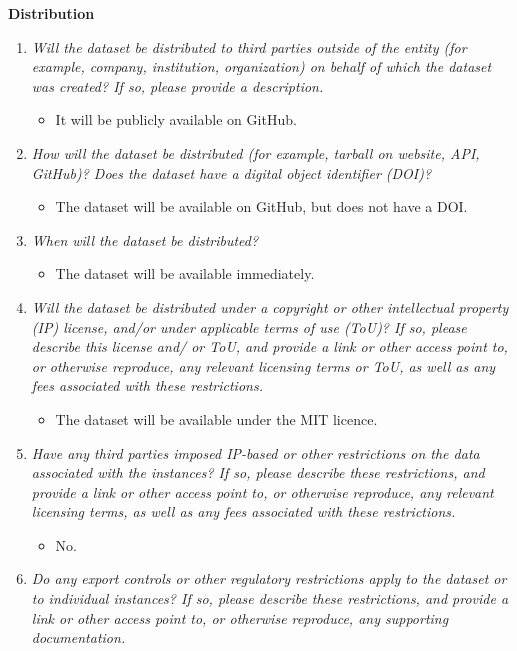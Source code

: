 \documentclass[
]{article}
\providecommand{\tightlist}{%
  \setlength{\itemsep}{0pt}\setlength{\parskip}{0pt}}
\begin{document}
\textbf{Distribution}

\begin{enumerate}
\def\labelenumi{\arabic{enumi}.}
\tightlist
\item
  \emph{Will the dataset be distributed to third parties outside of the entity (for example, company, institution, organization) on behalf of which the dataset was created? If so, please provide a description.}

  \begin{itemize}
  \tightlist
  \item
    It will be publicly available on GitHub.
  \end{itemize}
\item
  \emph{How will the dataset be distributed (for example, tarball on website, API, GitHub)? Does the dataset have a digital object identifier (DOI)?}

  \begin{itemize}
  \tightlist
  \item
    The dataset will be available on GitHub, but does not have a DOI.
  \end{itemize}
\item
  \emph{When will the dataset be distributed?}

  \begin{itemize}
  \tightlist
  \item
    The dataset will be available immediately.
  \end{itemize}
\item
  \emph{Will the dataset be distributed under a copyright or other intellectual property (IP) license, and/or under applicable terms of use (ToU)? If so, please describe this license and/ or ToU, and provide a link or other access point to, or otherwise reproduce, any relevant licensing terms or ToU, as well as any fees associated with these restrictions.}

  \begin{itemize}
  \tightlist
  \item
    The dataset will be available under the MIT licence.
  \end{itemize}
\item
  \emph{Have any third parties imposed IP-based or other restrictions on the data associated with the instances? If so, please describe these restrictions, and provide a link or other access point to, or otherwise reproduce, any relevant licensing terms, as well as any fees associated with these restrictions.}

  \begin{itemize}
  \tightlist
  \item
    No.
  \end{itemize}
\item
  \emph{Do any export controls or other regulatory restrictions apply to the dataset or to individual instances? If so, please describe these restrictions, and provide a link or other access point to, or otherwise reproduce, any supporting documentation.}


\end{enumerate}
\end{document}
